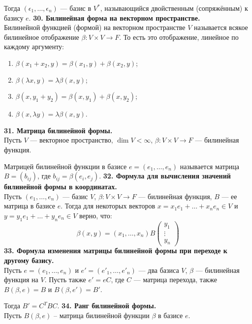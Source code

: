 \documentclass{article}
\begin{document}
Тогда $(\epsilon_1, \ldots, \epsilon_n)$ --- базис в $V^*$, называющийся двойственным (сопряжённым) к базису $e$.
\newline
\newline
\textbf{30. Билинейная форма на векторном пространстве.}\\
Билинейной функцией (формой) на векторном пространстве $V$ называется всякое билинейное отображение $\beta \colon V \times V \rightarrow F$. То есть это отображение, линейное по каждому аргументу:
\begin{enumerate}
\item $\beta(x_1 + x_2, y) = \beta(x_1, y) + \beta(x_2, y)$; 
\item $\beta(\lambda x, y) = \lambda\beta(x, y)$;
\item $\beta(x, y_1 + y_2) = \beta(x, y_1) + \beta(x, y_2)$;
\item $\beta(x, \lambda y) = \lambda\beta(x, y)$.
\end{enumerate}
\textbf{31. Матрица билинейной формы.}\\
Пусть $V$ --- векторное пространство, $\dim V < \infty$, $\beta \colon V \times V \rightarrow F$ --- билинейная функция.

Матрицей билинейной функции в базисе $e = (e_1, \ldots, e_n)$ называется матрица $B = (b_{ij})$, где $b_{ij}= \beta(e_i, e_j)$.
\newline
\newline
\textbf{32. Формула для вычисления значений билинейной формы в координатах.}\\
Пусть $(e_1, \ldots, e_n)$ --- базис $V$, $\beta \colon V \times V \to F$ --- билинейная функция, $B$ --- ее матрица в базисе $e $. Тогда для некоторых векторов $x = x_1e_1 + \ldots + x_ne_n \in V$ и $y = y_1e_1 + \ldots + y_ne_n \in V$ верно, что:
$$
\beta(x, y) = (x_1, \ldots, x_n)B \begin{pmatrix}y_1\\ \vdots \\ y_n \end{pmatrix}
$$
\textbf{33. Формула изменения матрицы билинейной формы при переходе к другому базису.}\\
Пусть $e = (e_1, \ldots, e_n)$ и $e' = (e'_1, \ldots, e'_n)$ --- два базиса $V$, $\beta$ --- билинейная функция на $V$. Пусть также $e' = e C$, где $C$ --- матрица перехода, также $B(\beta, e) = B$ и $B(\beta, e') = B'$.

Тогда $B' = C^TBC$.
\newline
\newline
\textbf{34. Ранг билинейной формы.}\\
Пусть $B(\beta, e)$ -- матрица билинейной функции $\beta$ в базисе $e$.
\end{document}
